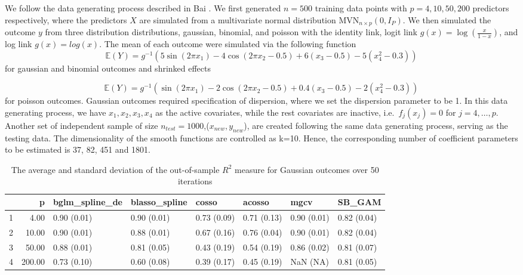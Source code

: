 \documentclass[AMA,STIX1COL,]{WileyNJD-v2}
\begin{document}
We follow the data generating process described in Bai \citep{Bai2021}.
We first generated \(n=500\) training data points with
\(p=4, 10, 50, 200\) predictors respectively, where the predictors \(X\)
are simulated from a multivariate normal distribution
\(\text{MVN}_{n\times p}(0, I_{P})\). We then simulated the outcome
\(y\) from three distribution distributions, gaussian, binomial, and
poisson with the identity link, logit link
\(g(x) = \log(\frac{x}{1-x})\), and log link \(g(x) = log(x)\). The mean
of each outcome were simulated via the following function \[
\mathbb{E}(Y) = g^{-1}(5 \sin(2\pi x_1) - 4 \cos(2\pi x_2 -0.5) + 6(x_3-0.5) - 5(x_4^2 -0.3))
\] for gaussian and binomial outcomes and shrinked effects

\[
\mathbb{E}(Y) = g^{-1}(\sin(2\pi x_1) - 2\cos(2\pi x_2 -0.5) + 0.4(x_3-0.5) - 2(x_4^2 -0.3))
\] for poisson outcomes. Gaussian outcomes required specification of
dispersion, where we set the dispersion parameter to be 1. In this data
generating process, we have \(x_1, x_2, x_3, x_4\) as the active
covariates, while the rest covariates are inactive,
i.e.~\(f_j(x_j) = 0\) for \(j = 4, \dots, p\). Another set of
independent sample of size \(n_{test}=1000\),(\(x_{new} ,y_{new}\)), are
created following the same data generating process, serving as the
testing data. The dimensionality of the smooth functions are controlled
as k=10. Hence, the corresponding number of coefficient parameters to be
estimated is 37, 82, 451 and 1801.

\begin{table}[ht]
\centering
\begin{tabular}{rrllllll}
  \hline
 & p & bglm\_spline\_de & blasso\_spline & cosso & acosso & mgcv & SB\_GAM \\ 
  \hline
1 & 4.00 & 0.90 (0.01) & 0.90 (0.01) & 0.73 (0.09) & 0.71 (0.13) & 0.90 (0.01) & 0.82 (0.04) \\ 
  2 & 10.00 & 0.90 (0.01) & 0.88 (0.01) & 0.67 (0.16) & 0.76 (0.04) & 0.90 (0.01) & 0.82 (0.04) \\ 
  3 & 50.00 & 0.88 (0.01) & 0.81 (0.05) & 0.43 (0.19) & 0.54 (0.19) & 0.86 (0.02) & 0.81 (0.07) \\ 
  4 & 200.00 & 0.73 (0.10) & 0.60 (0.08) & 0.39 (0.17) & 0.45 (0.19) & NaN (NA) & 0.81 (0.05) \\ 
   \hline
\end{tabular}
\caption{The average and standard deviation of the out-of-sample $R^2$ measure for Gaussian outcomes over 50 iterations} 
\label{tab:gaus}
\end{table}
\end{document}
